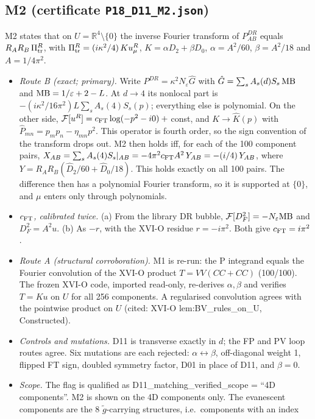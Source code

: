 \subsection{M2 (certificate \texttt{P18\_D11\_M2.json})}
M2 states that on $U=\mathbb R^4\setminus\{0\}$ the inverse Fourier transform of $P^{DR}_{AB}$ equals
$R_AR_B\,\Pi^R_{\rm tr}$, with $\Pi^R_{\rm tr}=(i\kappa^2/4)\,K u^R_\mu$, $K=\alpha D_2+\beta D_0$,
$\alpha=A^2/60$, $\beta=A^2/18$ and $A=1/4\pi^2$.
\begin{itemize}
\item \emph{Route B (exact; primary).} Write $P^{DR}=\kappa^2N_\varepsilon\hat G$ with
  $\hat G=\sum_sA_s(d)S_s\,{\rm MB}$ and ${\rm MB}=1/\varepsilon+2-L$. At $d\to4$ its nonlocal part is
  $-(i\kappa^2/16\pi^2)L\sum_sA_s(4)S_s(p)$; everything else is polynomial. On the other side,
  $\mathcal F[u^R]=c_{\rm FT}\log(-p^2-i0)+{}$const, and $K\to\hat K(p)$ with
  $\hat P_{mn}=p_mp_n-\eta_{mn}p^2$. This operator is fourth order, so the sign convention of the transform drops out.
  M2 then holds iff, for each of the 100 component pairs,
  $X_{AB}=\sum_sA_s(4)S_s|_{AB}=-4\pi^2c_{\rm FT}A^2\,Y_{AB}=-(i/4)\,Y_{AB}$, where
  $Y=R_AR_B(\hat D_2/60+\hat D_0/18)$. This holds exactly on all 100 pairs. The difference then has a polynomial
  Fourier transform, so it is supported at $\{0\}$, and $\mu$ enters only through polynomials.
\item \emph{$c_{\rm FT}$, calibrated twice.} (a) From the library DR bubble,
  $\mathcal F[D_F^2]=-N_\varepsilon{\rm MB}$ and $D_F^2=A^2u$. (b) As $-r$, with the XVI-O residue $r=-i\pi^2$. Both
  give $c_{\rm FT}=i\pi^2$.
\item \emph{Route A (structural corroboration).} M1 is re-run: the P integrand equals the Fourier convolution of the
  XVI-O product $T=VV(CC+CC)$ (100/100). The frozen XVI-O code, imported read-only, re-derives $\alpha,\beta$ and
  verifies $T=Ku$ on $U$ for all 256 components. A regularised convolution agrees with the pointwise product on $U$
  (cited: XVI-O lem:BV\_rules\_on\_U, Constructed).
\item \emph{Controls and mutations.} D11 is transverse exactly in $d$; the FP and PV loop routes agree. Six mutations
  are each rejected: $\alpha\leftrightarrow\beta$, off-diagonal weight 1, flipped FT sign, doubled symmetry factor,
  D01 in place of D11, and $\beta=0$.
\item \emph{Scope.} The flag is qualified as D11\_matching\_verified\_scope = ``4D components''. M2 is shown on the
  4D components only. The evanescent components are the 8 $\tilde g$-carrying structures, i.e.\ components with an index

\end{itemize}
